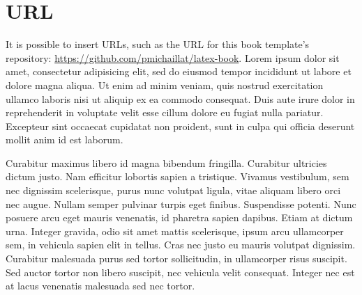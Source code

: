 \section{URL}

It is possible to insert URLs, such as the URL for this book template's repository: \url{https://github.com/pmichaillat/latex-book}. Lorem ipsum dolor sit amet, consectetur adipisicing elit, sed do eiusmod tempor incididunt ut labore et dolore magna aliqua. Ut enim ad minim veniam, quis nostrud exercitation ullamco laboris nisi ut aliquip ex ea commodo consequat. Duis aute irure dolor in reprehenderit in voluptate velit esse
cillum dolore eu fugiat nulla pariatur. Excepteur sint occaecat cupidatat non
proident, sunt in culpa qui officia deserunt mollit anim id est laborum.

Curabitur maximus libero id magna bibendum fringilla. Curabitur ultricies dictum justo. Nam efficitur lobortis sapien a tristique. Vivamus vestibulum, sem nec dignissim scelerisque, purus nunc volutpat ligula, vitae aliquam libero orci nec augue. Nullam semper pulvinar turpis eget finibus. Suspendisse potenti. Nunc posuere arcu eget mauris venenatis, id pharetra sapien dapibus. Etiam at dictum urna. Integer gravida, odio sit amet mattis scelerisque, ipsum arcu ullamcorper sem, in vehicula sapien elit in tellus. Cras nec justo eu mauris volutpat dignissim. Curabitur malesuada purus sed tortor sollicitudin, in ullamcorper risus suscipit. Sed auctor tortor non libero suscipit, nec vehicula velit consequat. Integer nec est at lacus venenatis malesuada sed nec tortor.
